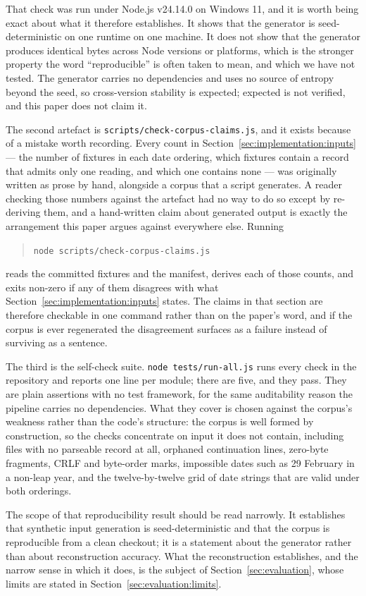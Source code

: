 That check was run under Node.js v24.14.0 on Windows 11, and it is worth being
exact about what it therefore establishes. It shows that the generator is
seed-deterministic on one runtime on one machine. It does not show that the
generator produces identical bytes across Node versions or platforms, which is the
stronger property the word ``reproducible'' is often taken to mean, and which we
have not tested. The generator carries no dependencies and uses no source of
entropy beyond the seed, so cross-version stability is expected; expected is not
verified, and this paper does not claim it.

The second artefact is
\texttt{scripts/\allowbreak check-\allowbreak corpus-\allowbreak claims.js}, and
it exists because of a mistake worth recording. Every count in
Section~\ref{sec:implementation:inputs} --- the number of fixtures in each date
ordering, which fixtures contain a record that admits only one reading, and which
one contains none --- was originally written as prose by hand, alongside a corpus
that a script generates. A reader checking those numbers against the artefact had
no way to do so except by re-deriving them, and a hand-written claim about
generated output is exactly the arrangement this paper argues against everywhere
else. Running

\begin{quote}
\texttt{node scripts/check-corpus-claims.js}
\end{quote}

reads the committed fixtures and the manifest, derives each of those counts, and
exits non-zero if any of them disagrees with what
Section~\ref{sec:implementation:inputs} states. The claims in that section are
therefore checkable in one command rather than on the paper's word, and if the
corpus is ever regenerated the disagreement surfaces as a failure instead of
surviving as a sentence.

The third is the self-check suite. \texttt{node tests/run-all.js} runs every
check in the repository and reports one line per module; there are five, and they
pass. They are plain assertions with no test framework, for the same
auditability reason the pipeline carries no dependencies. What they cover is
chosen against the corpus's weakness rather than the code's structure: the corpus
is well formed by construction, so the checks concentrate on input it does not
contain, including files with no parseable record at all, orphaned continuation
lines, zero-byte fragments, CRLF and byte-order marks, impossible dates such as
29 February in a non-leap year, and the twelve-by-twelve grid of date strings
that are valid under both orderings.

The scope of that reproducibility result should be read narrowly. It
establishes that synthetic input generation is seed-deterministic and that the
corpus is reproducible from a clean checkout; it is a statement about the
generator rather than about reconstruction accuracy. What the reconstruction
establishes, and the narrow sense in which it does, is the subject of
Section~\ref{sec:evaluation}, whose limits are stated in
Section~\ref{sec:evaluation:limits}.
